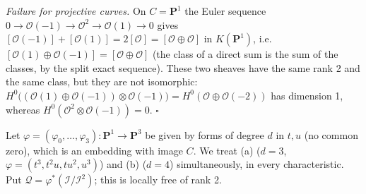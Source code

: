 \documentclass[11pt]{article}
\begin{document}
\emph{Failure for projective curves.} On $C=\mathbf P^1$ the Euler sequence $0\to\mathcal O(-1)\to\mathcal O^2\to\mathcal O(1)\to0$ gives $[\mathcal O(-1)]+[\mathcal O(1)]=2[\mathcal O]=[\mathcal O\oplus\mathcal O]$ in $K(\mathbf P^1)$, i.e.\ $[\mathcal O(1)\oplus\mathcal O(-1)]=[\mathcal O\oplus\mathcal O]$ (the class of a direct sum is the sum of the classes, by the split exact sequence). These two sheaves have the same rank 2 and the same class, but they are not isomorphic: $H^0\bigl((\mathcal O(1)\oplus\mathcal O(-1))\otimes\mathcal O(-1)\bigr)=H^0(\mathcal O\oplus\mathcal O(-2))$ has dimension 1, whereas $H^0(\mathcal O^2\otimes\mathcal O(-1))=0$. \hfill$\square$

\pf
Let $\varphi=(\varphi_0,\dots,\varphi_3)\colon\mathbf P^1\to\mathbf P^3$ be given by forms of degree $d$ in $t,u$ (no common zero), which is an embedding with image $C$. We treat (a) ($d=3$, $\varphi=(t^3,t^2u,tu^2,u^3)$) and (b) ($d=4$) simultaneously, in every characteristic. Put $\mathcal Q=\varphi^*(\mathcal I/\mathcal I^2)$; this is locally free of rank 2.
\end{document}
